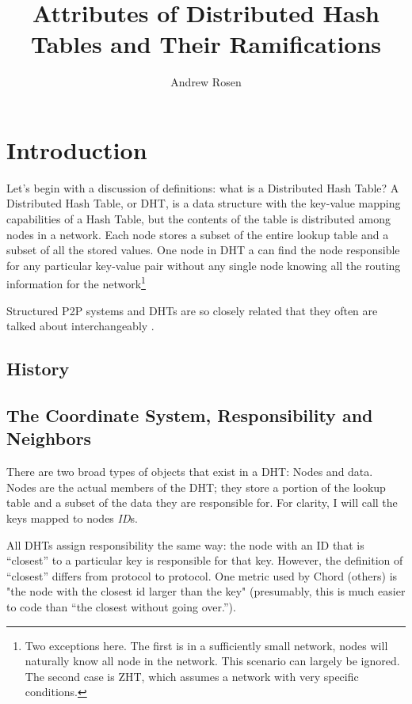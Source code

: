 \documentclass[10pt,letterpaper]{report}
\author{Andrew Rosen}
\title{Attributes of Distributed Hash Tables and Their Ramifications}
\begin{document}
\maketitle
\setcounter{tocdepth}{4}



\tableofcontents

\chapter{Introduction}
Let's begin with a discussion of definitions:  what is a Distributed Hash Table?
A Distributed Hash Table, or DHT, is a data structure with the key-value mapping capabilities of a Hash Table, but the contents of the table is distributed among nodes in a network.
Each node stores a subset of the entire lookup table and a subset of all the stored values.
One node in DHT a can find the node responsible for any particular key-value pair without any single node knowing all the routing information for the network\footnote{Two exceptions here.  
The first is in a sufficiently small network, nodes will naturally know  all node in the network. This scenario can largely be ignored.  The second case is ZHT, which assumes a network with very specific conditions.}




Structured P2P systems and DHTs are so closely related that they often are talked about interchangeably  \cite{wu2004handbook} \cite{lua2005survey}. 



\section{History}


\section{The Coordinate System, Responsibility and Neighbors}


There are two  broad types of objects that exist in a DHT: Nodes and data.  
Nodes are the actual members of the DHT; they store a portion of the lookup table and a subset of the data they are responsible for. 
For clarity, I will call the keys mapped to nodes \textit{ID}s. 

All DHTs assign responsibility the same way:  the node with an ID that is ``closest'' to a particular key is responsible for that key.  
However, the definition of ``closest'' differs from protocol to protocol.
One metric used by Chord (others) is "the node with the closest id larger than the key" (presumably, this is much easier to code than ``the closest without going over.'').
\end{document}
